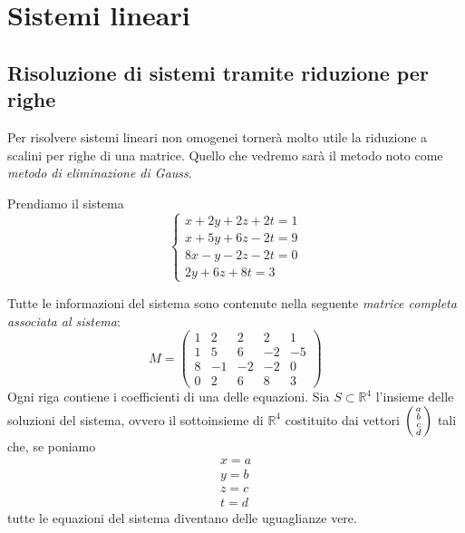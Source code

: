 \chapter{Sistemi lineari}
\section{Risoluzione di sistemi tramite riduzione per righe}
Per risolvere sistemi lineari non omogenei torner\`a molto utile la riduzione
a scalini per righe di una matrice. Quello che vedremo sar\`a il metodo noto come
\emph{metodo di	eliminazione di Gauss}.

\begin{example}
	Prendiamo il sistema
	\begin{equation*}
		\begin{cases}
			x + 2y + 2z + 2t = 1 \\
			x +5y + 6z -2t = 9   \\
			8x - y -2z -2t = 0   \\
			2y + 6z + 8t = 3
		\end{cases}
	\end{equation*}
	
	Tutte le informazioni del sistema sono contenute nella seguente
	\emph{matrice completa associata al sistema}:
	\begin{equation*}
		M = \begin{pmatrix}
			1 & 2  & 2  & 2  & 1  \\
			1 & 5  & 6  & -2 & -5 \\
			8 & -1 & -2 & -2 & 0  \\
			0 & 2  & 6  & 8  & 3
		\end{pmatrix}
	\end{equation*}
	Ogni riga contiene i coefficienti di una delle equazioni.
	Sia $S \subset \mathbb{R}^4$ l'insieme delle soluzioni del sistema, ovvero
	il sottoinsieme di $\mathbb{R}^4$ costituito dai vettori
	$\begin{psmallmatrix} a \\ b \\ c \\ d \end{psmallmatrix}$ tali che, se poniamo
	\begin{gather*}
		x = a \\
		y = b \\
		z = c \\
		t = d
	\end{gather*}
	tutte le equazioni del sistema diventano delle uguaglianze vere.
\end{example}


